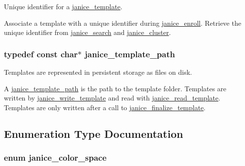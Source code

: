 Unique identifier for a \hyperlink{group__janice_ga5593b06e86b90504968c0fc191ee2f3c}{janice\+\_\+template}. 

Associate a template with a unique identifier during \hyperlink{group__janice_gae853da58f37454ddc14316da24543565}{janice\+\_\+enroll}. Retrieve the unique identifier from \hyperlink{group__janice_ga073aa5f2133223c0b31ac3e78671836a}{janice\+\_\+search} and \hyperlink{group__janice_ga20d0206073850de0224651441c980ee7}{janice\+\_\+cluster}. \hypertarget{group__janice_gafaa1c0182c7a56aaafea6e2bfe471cc8}{}
\subsubsection[{janice\+\_\+template\+\_\+path}]{\setlength{\rightskip}{0pt plus 5cm}typedef const char$\ast$ {\bf janice\+\_\+template\+\_\+path}}\label{group__janice_gafaa1c0182c7a56aaafea6e2bfe471cc8}


Templates are represented in persistent storage as files on disk. 

A \hyperlink{group__janice_gafaa1c0182c7a56aaafea6e2bfe471cc8}{janice\+\_\+template\+\_\+path} is the path to the template folder. Templates are written by \hyperlink{group__janice_ga0d4dbc4c5af8e9be07634e5da920f51b}{janice\+\_\+write\+\_\+template} and read with \hyperlink{group__janice_gace5b3f84daa9349c4557f4e0c8b23a13}{janice\+\_\+read\+\_\+template}. Templates are only written after a call to \hyperlink{group__janice_gaf4894cf8cd61aa1ec60541f11cdb6de8}{janice\+\_\+finalize\+\_\+template}. 

\subsection{Enumeration Type Documentation}
\hypertarget{group__janice_ga4040c8aa81857fc2102f27cf34cd973e}{}
\subsubsection[{janice\+\_\+color\+\_\+space}]{\setlength{\rightskip}{0pt plus 5cm}enum {\bf janice\+\_\+color\+\_\+space}}\label{group__janice_ga4040c8aa81857fc2102f27cf34cd973e}


